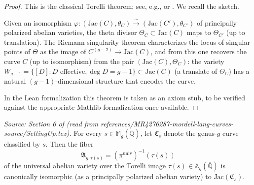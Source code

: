 \begin{proof}
  This is the classical Torelli theorem; see, e.g., \cite[Chapter~12]{BirkenhakeLange}
  or \cite[IV.1]{Mumford:CurveAV}. We recall the sketch.

  Given an isomorphism \(\varphi \colon (\mathrm{Jac}(C), \theta_C) \xrightarrow{\sim}
  (\mathrm{Jac}(C'), \theta_{C'})\) of principally polarized abelian varieties, the
  theta divisor \(\Theta_C \subset \mathrm{Jac}(C)\) maps to \(\Theta_{C'}\) (up to
  translation). The Riemann singularity theorem characterizes the locus of singular
  points of \(\Theta\) as the image of \(C^{(g-2)} \to \mathrm{Jac}(C)\), and from
  this one recovers the curve \(C\) (up to isomorphism) from the pair
  \((\mathrm{Jac}(C), \Theta_C)\): the variety \(W_{g-1} = \{[D] : D \text{ effective},
  \deg D = g-1\} \subset \mathrm{Jac}(C)\) (a translate of \(\Theta_C\)) has a
  natural \((g-1)\)-dimensional structure that encodes the curve.

  In the Lean formalization this theorem is taken as an axiom stub, to be verified
  against the appropriate Mathlib formalization once available.
\end{proof}

\begin{lemma}
  \label{lem:universal_jacobian_fib}
  \textit{Source: Section 6 of \cite{MR4276287-mordell-lang-curves} (read from
  references/MR4276287-mordell-lang-curves-source/SettingUp.tex).}
  For every \(s \in \mathbb{M}_g(\overline{\mathbb{Q}})\), let \(\mathfrak{C}_s\)
  denote the genus-\(g\) curve classified by \(s\). Then the fiber
  \[
    \mathfrak{A}_{g,\tau(s)} = (\pi^{\mathrm{univ}})^{-1}(\tau(s))
  \]
  of the universal abelian variety over the Torelli image \(\tau(s) \in
  \mathbb{A}_g(\overline{\mathbb{Q}})\) is canonically isomorphic (as a
  principally polarized abelian variety) to \(\mathrm{Jac}(\mathfrak{C}_s)\).
\end{lemma}

